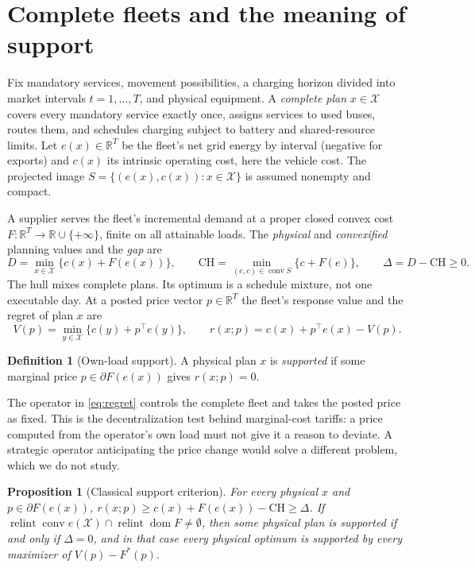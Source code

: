 \documentclass[11pt]{article}
\newtheorem{proposition}[theorem]{Proposition}
\theoremstyle{definition}\newtheorem{definition}[theorem]{Definition}
\theoremstyle{remark}\newtheorem{remark}[theorem]{Remark}
\newcommand{\R}{\mathbb R}
\newcommand{\X}{\mathcal X}
\newcommand{\CH}{\mathrm{CH}}
\newcommand{\conv}{\operatorname{conv}}
\newcommand{\relint}{\operatorname{relint}}
\begin{document}
\section{Complete fleets and the meaning of support}\label{sec:model}

Fix mandatory services, movement possibilities, a charging horizon divided into
market intervals $t=1,\dots,T$, and physical equipment. A \emph{complete plan}
$x\in\X$ covers every mandatory service exactly once, assigns services to used
buses, routes them, and schedules charging subject to battery and shared-resource
limits. Let $e(x)\in\R^T$ be the fleet's net grid energy by interval (negative
for exports) and $c(x)$ its intrinsic operating cost, here the vehicle cost.
The projected image $S=\{(e(x),c(x)):x\in\X\}$ is assumed nonempty and compact.

A supplier serves the fleet's incremental demand at a proper closed convex cost
$F:\R^T\to\R\cup\{+\infty\}$, finite on all attainable loads. The
\emph{physical} and \emph{convexified} planning values and the \emph{gap} are
\begin{equation}\label{eq:DCH}
 D=\min_{x\in\X}\{c(x)+F(e(x))\},\qquad
 \CH=\min_{(e,c)\in\conv S}\{c+F(e)\},\qquad
 \Delta=D-\CH\ge0.
\end{equation}
The hull mixes complete plans. Its optimum is a schedule mixture, not one
executable day. At a posted price vector $p\in\R^T$ the fleet's response value
and the regret of plan $x$ are
\begin{equation}\label{eq:regret}
 V(p)=\min_{y\in\X}\{c(y)+p^\top e(y)\},\qquad r(x;p)=c(x)+p^\top e(x)-V(p).
\end{equation}

\begin{definition}[Own-load support]\label{def:support}
A physical plan $x$ is \emph{supported} if some marginal price
$p\in\partial F(e(x))$ gives $r(x;p)=0$.
\end{definition}

The operator in \eqref{eq:regret} controls the complete fleet and takes the posted
price as fixed. This is the decentralization test behind marginal-cost tariffs:
a price computed from the operator's own load must not give it a reason to
deviate. A strategic operator anticipating the price change would solve a
different problem, which we do not study.

\begin{proposition}[Classical support criterion]\label{prop:support}
For every physical $x$ and $p\in\partial F(e(x))$, $r(x;p)\ge c(x)+F(e(x))-\CH\ge\Delta$.
If $\relint\conv e(\X)\cap\relint\operatorname{dom}F\neq\emptyset$, then some
physical plan is supported if and only if $\Delta=0$, and in that case every
physical optimum is supported by every maximizer of $V(p)-F^*(p)$.
\end{proposition}
\end{document}
